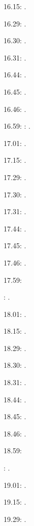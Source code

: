 \label{key}\documentclass[italian]{article}
\begin{document}
16.15:     . 

16.29:     . 

16.30:     .

16.31:     .

16.44:     .

16.45:     .

16.46:     .

16.59:     
:    .

17.01:     . 

17.15:     . 

17.29:     . 

17.30:     .

17.31:     .

17.44:     .

17.45:     .

17.46:     .

17.59:     

:    .

18.01:     . 

18.15:     . 

18.29:     . 

18.30:     .

18.31:     .

18.44:     .

18.45:     .

18.46:     .

18.59:     

:    .

19.01:     . 

19.15:     . 

19.29:     . 
\end{document}
